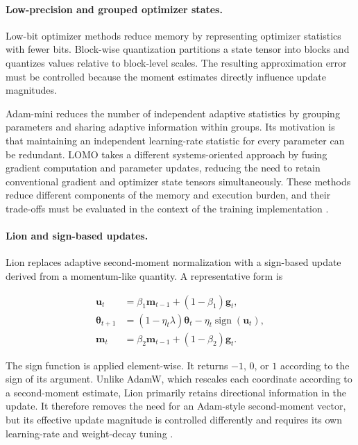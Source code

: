\paragraph{Low-precision and grouped optimizer states.}
Low-bit optimizer methods reduce memory by representing optimizer
statistics with fewer bits. Block-wise quantization partitions a
state tensor into blocks and quantizes values relative to block-level
scales. The resulting approximation error must be controlled because
the moment estimates directly influence update magnitudes.

Adam-mini reduces the number of independent adaptive statistics by
grouping parameters and sharing adaptive information within groups.
Its motivation is that maintaining an independent learning-rate
statistic for every parameter can be redundant. LOMO takes a different
systems-oriented approach by fusing gradient computation and parameter
updates, reducing the need to retain conventional gradient and optimizer
state tensors simultaneously. These methods reduce different components
of the memory and execution burden, and their trade-offs must be
evaluated in the context of the training implementation
\parencite{Ranganath2026Navigating}.

\paragraph{Lion and sign-based updates.}
Lion replaces adaptive second-moment normalization with a sign-based
update derived from a momentum-like quantity. A representative form is

\begin{align}
    \mathbf{u}_t
    &=
    \beta_1\mathbf{m}_{t-1}
    +(1-\beta_1)\mathbf{g}_t,
    \label{eq:opt-lion-direction}\\
    \boldsymbol{\theta}_{t+1}
    &=
    (1-\eta_t\lambda)\boldsymbol{\theta}_t
    -
    \eta_t\operatorname{sign}(\mathbf{u}_t),
    \label{eq:opt-lion-update}\\
    \mathbf{m}_t
    &=
    \beta_2\mathbf{m}_{t-1}
    +(1-\beta_2)\mathbf{g}_t.
    \label{eq:opt-lion-state}
\end{align}

The sign function is applied element-wise. It returns $-1$, $0$, or $1$
according to the sign of its argument. Unlike AdamW, which rescales
each coordinate according to a second-moment estimate, Lion primarily
retains directional information in the update. It therefore removes
the need for an Adam-style second-moment vector, but its effective
update magnitude is controlled differently and requires its own
learning-rate and weight-decay tuning
\parencite{Ranganath2026Navigating,Wen2026Fantastic}.

